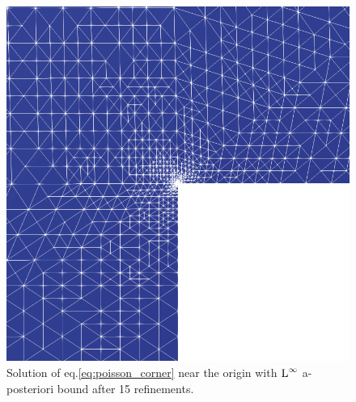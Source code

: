 \documentclass[a4paper,11pt]{article}
\begin{document}
{


\begin{figure}[h!]
    \centering
    \includegraphics[width=0.35\linewidth]{Images/Test1/h-adaptive/u_infty.png}
\caption{Solution of eq.\eqref{eq:poisson_corner} near the origin with $\operatorname L^{\infty}$ a-posteriori bound after 15 refinements.}
\label{fig:h-ref_infty}
\end{figure}


}
\end{document}
